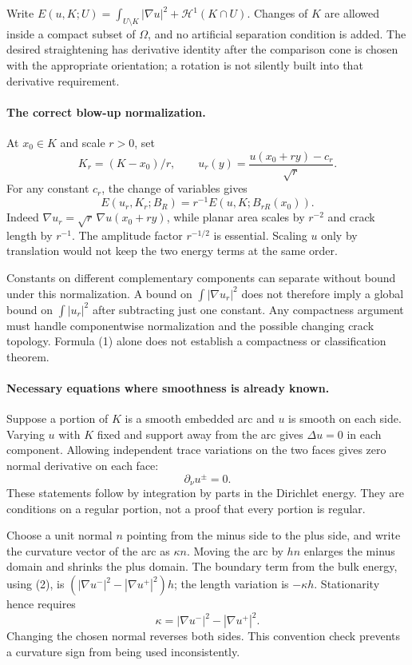 \documentclass[11pt]{article}
\begin{document}
Write $E(u,K;U)=\int_{U\setminus K}|\nabla u|^2+
\mathcal H^1(K\cap U)$. Changes of $K$ are allowed inside a compact
subset of $\Omega$, and no artificial separation condition is added.
The desired straightening has derivative identity after the comparison
cone is chosen with the appropriate orientation; a rotation is not
silently built into that derivative requirement.

\paragraph{The correct blow-up normalization.}
At $x_0\in K$ and scale $r>0$, set
\[
 K_r=(K-x_0)/r,\qquad
 u_r(y)=\frac{u(x_0+ry)-c_r}{\sqrt r}.
\]
For any constant $c_r$, the change of variables gives
\[
           E(u_r,K_r;B_R)=r^{-1}E(u,K;B_{rR}(x_0)).       \tag{1}
\]
Indeed $\nabla u_r=\sqrt r\,\nabla u(x_0+ry)$, while planar area
scales by $r^{-2}$ and crack length by $r^{-1}$.
The amplitude factor $r^{-1/2}$ is essential. Scaling $u$ only by
translation would not keep the two energy terms at the same order.

Constants on different complementary components can separate without
bound under this normalization. A bound on $\int|\nabla u_r|^2$ does
not therefore imply a global bound on $\int|u_r|^2$ after subtracting
just one constant. Any compactness argument must handle componentwise
normalization and the possible changing crack topology. Formula (1)
alone does not establish a compactness or classification theorem.

\paragraph{Necessary equations where smoothness is already known.}
Suppose a portion of $K$ is a smooth embedded arc and $u$ is smooth on
each side. Varying $u$ with $K$ fixed and support away from the arc gives
$\Delta u=0$ in each component. Allowing independent trace variations
on the two faces gives zero normal derivative on each face:
\[
                              \partial_\nu u^\pm=0.      \tag{2}
\]
These statements follow by integration by parts in the Dirichlet energy.
They are conditions on a regular portion, not a proof that every
portion is regular.

Choose a unit normal $n$ pointing from the minus side to the plus side,
and write the curvature vector of the arc as $\kappa n$.
Moving the arc by $h n$ enlarges the minus domain and shrinks the plus
domain. The boundary term from the bulk energy, using (2), is
$(|\nabla u^-|^2-|\nabla u^+|^2)h$; the length variation is
$-\kappa h$. Stationarity hence requires
\[
                         \kappa=|\nabla u^-|^2-|\nabla u^+|^2.
                                                               \tag{3}
\]
Changing the chosen normal reverses both sides. This convention check
prevents a curvature sign from being used inconsistently.
\end{document}
